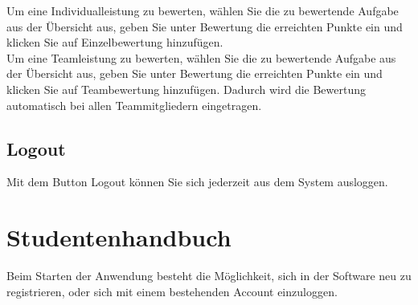 \documentclass{Handbuch}
\begin{document}
Um eine Individualleistung zu bewerten, wählen Sie die zu bewertende Aufgabe aus der Übersicht aus, geben Sie unter \glqq Bewertung\grqq{} die erreichten Punkte ein und klicken Sie auf \frqq Einzelbewertung hinzufügen\flqq.\\
Um eine Teamleistung zu bewerten, wählen Sie die zu bewertende Aufgabe aus der Übersicht aus, geben Sie unter \glqq Bewertung\grqq{} die erreichten Punkte ein und klicken Sie auf \frqq Teambewertung hinzufügen\flqq. Dadurch wird die Bewertung automatisch bei allen Teammitgliedern eingetragen. 


\subsection{Logout}
Mit dem Button \frqq Logout\flqq{} können Sie sich jederzeit aus dem System ausloggen.


\newpage
\section{Studentenhandbuch}
Beim Starten der Anwendung besteht die Möglichkeit, sich in der Software neu zu registrieren, oder sich mit einem bestehenden Account einzuloggen.
\end{document}
